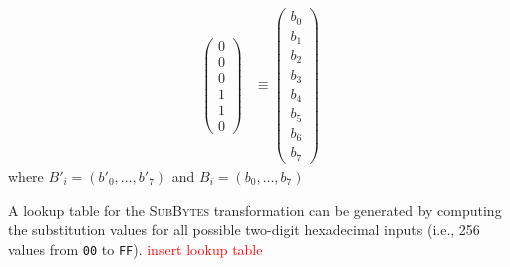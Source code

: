 \begin{enumerate}
\begin{align}
\begin{pmatrix}
            0\\
            0\\
            0\\
            1\\
            1\\
            0
        \end{pmatrix}
        &\equiv
        \begin{pmatrix}
            b_0\\
            b_1\\
            b_2\\
            b_3\\
            b_4\\
            b_5\\
            b_6\\
            b_7
        \end{pmatrix}
    \end{align}
    where ${B'_i} = \left( {b'}_0, \dots, {b'}_7 \right)$ and $B_i = \left( b_0, \dots, b_7 \right)$
\end{enumerate}

A lookup table for the \textsc{SubBytes} transformation can be generated by computing the substitution values for all possible two-digit hexadecimal inputs (i.e., 256 values from \texttt{00} to \texttt{FF}).
\textcolor{red}{insert lookup table}